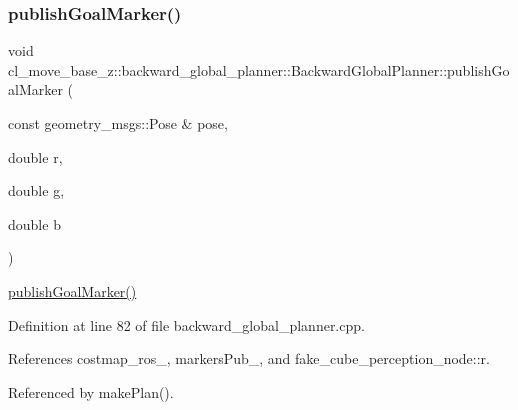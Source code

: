 \subsubsection{\texorpdfstring{publish\+Goal\+Marker()}{publishGoalMarker()}}
{\footnotesize\ttfamily void cl\+\_\+move\+\_\+base\+\_\+z\+::backward\+\_\+global\+\_\+planner\+::\+Backward\+Global\+Planner\+::publish\+Goal\+Marker (\begin{DoxyParamCaption}\item[{const geometry\+\_\+msgs\+::\+Pose \&}]{pose,  }\item[{double}]{r,  }\item[{double}]{g,  }\item[{double}]{b }\end{DoxyParamCaption})\hspace{0.3cm}{\ttfamily [private]}}

\hyperlink{classcl__move__base__z_1_1backward__global__planner_1_1BackwardGlobalPlanner_a3c6784cad10fdadf28323380fe3d6d2b}{publish\+Goal\+Marker()} 

Definition at line 82 of file backward\+\_\+global\+\_\+planner.\+cpp.



References costmap\+\_\+ros\+\_\+, markers\+Pub\+\_\+, and fake\+\_\+cube\+\_\+perception\+\_\+node\+::r.



Referenced by make\+Plan().



